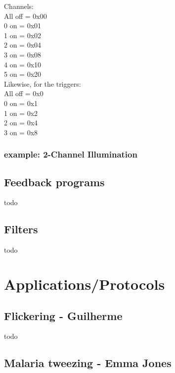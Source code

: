 \documentclass{report}
\begin{document}
Channels:\\
All off = 0x00\\
0 on = 0x01\\
1 on = 0x02\\
2 on = 0x04\\
3 on = 0x08\\
4 on = 0x10\\
5 on = 0x20\\

Likewise, for the triggers:\\
All off = 0x0\\
0 on = 0x1\\
1 on = 0x2\\
2 on = 0x4\\
3 on = 0x8\\

\newpage

\subsection{example:  2-Channel Illumination}



\section{Feedback programs}

todo



\section{Filters}

todo





\newpage


\chapter{Applications/Protocols}

\section{Flickering - Guilherme}
 todo

\section{Malaria tweezing - Emma Jones}
\end{document}
